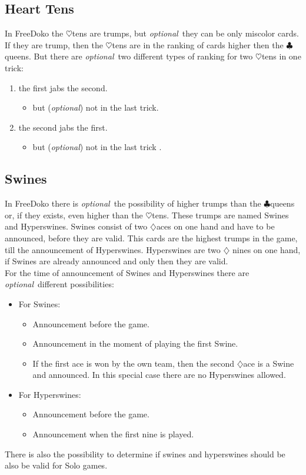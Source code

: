 \documentclass[12pt,a4paper]{article}
\newcommand{\kreuz}{$\clubsuit$}
\newcommand{\herz}{$\heartsuit$}
\newcommand{\karo}{$\diamondsuit$}
\newcommand{\optional}{\textit{optional}}
\begin{document}
\subsection{Heart Tens}
In FreeDoko the \herz tens are trumps, but \optional\ they can be
only miscolor cards. If they are trump, then the \herz tens are
in the ranking of cards higher then the \kreuz queens. But there
are \optional\ two different types of ranking for two \herz tens
in one trick:
\begin{enumerate}
\item the first jabs the second.
\begin{itemize}
\item but (\optional) not in the last trick.
\end{itemize}
\item the second jabs the first.
\begin{itemize}
\item but (\optional) not in the last trick .
\end{itemize}
\end{enumerate}
\subsection{Swines}
In FreeDoko there is \optional\ the possibility of higher trumps
than the \kreuz queens or, if they exists, even higher than the
\herz tens. These trumps are named Swines and Hyperswines. Swines
consist of two \karo aces on one hand and have to be announced,
before they are valid.
 This cards are the highest trumps in the game,
till the announcement of Hyperswines. Hyperswines are two \karo
nines on one hand, if Swines are already announced and
only then they are valid.\\
For the time of announcement of Swines and Hyperswines there are
\optional\ different possibilities:
\begin{itemize}
\item For Swines:
\begin{itemize}
\item Announcement before the game.
\item Announcement in the moment of playing the first Swine.
\item If the first ace is won by the own team, then the second \karo ace is a Swine and announced.
In this special case there are  no Hyperswines allowed.
\end{itemize}
\item For Hyperswines:
\begin{itemize}
\item Announcement before the game.
\item Announcement when the first nine is played.
\end{itemize}
\end{itemize}
There is also the possibility to determine if swines and
hyperswines should be also be valid for Solo games.
\end{document}
